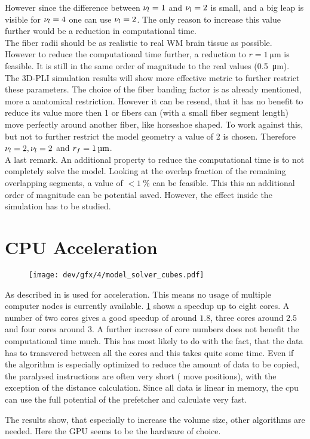 However since the difference between $\textnormal{$\nu_{l}$}=\SI{1}{}$ and $\textnormal{$\nu_{l}$}=\SI{2}{}$ is small, and a big leap is visible for $\textnormal{$\nu_{l}$}=\SI{4}{}$ one can use $\textnormal{$\nu_{l}$}=\SI{2}{}$.
The only reason to increase this value further would be a reduction in computational time.
\\
% 
The fiber radii should be as realistic to real \acs{WM} brain tissue as possible.
However to reduce the computational time further, a reduction to $r = \SI{1}{\micro\meter}$ is feasible.
It is still in the same order of magnitude to the real values (\SI{0.5}{\micro\meter}).
The \ac{3D-PLI} simulation results will show more effective metric to further restrict these parameters.
% 
The choice of the fiber banding factor is as already mentioned, more a anatomical restriction.
However it can be resend, that it has no benefit to reduce its value more then 1 or fibers can (with a small fiber segment length) move perfectly around another fiber, like horseshoe shaped.
To work against this, but not to further restrict the model geometry a value of 2 is chosen.
Therefore $\textnormal{$\nu_{l}$} = \SI{2}{}, \textnormal{$\nu_{l}$}=\SI{2}{}$ and $\fiberRadius=\SI{1}{\micro\meter}$.
\\
% 
A last remark.
An additional property to reduce the computational time is to not completely solve the model. 
Looking at the overlap fraction of the remaining overlapping segments, a value of $<\SI{1}{\percent}$ can be feasible.
This this an additional order of magnitude can be potential saved.
However, the effect inside the simulation has to be studied.
% 
\section{CPU Acceleration}
% 
\begin{figure}[!t]
\centering
\texttt{[image: dev/gfx/4/model\_solver\_cubes.pdf]}
\caption[speedup]{ }
\label{fig:solverSpeedup}
\end{figure}
% 
% 
As described in \dummy{} \openmp{} is used for acceleration.
This means no usage of multiple computer nodes is currently available.
\cref{fig:solverSpeedup} shows a speedup up to eight cores.
A number of two cores gives a good speedup of around $1.8$, three cores around $2.5$ and four cores around $3$.
A further incresse of core numbers does not benefit the computational time much.
This has most likely to do with the fact, that the data has to transvered between all the cores and this takes quite some time.
Even if the algorithm is especially optimized to reduce the amount of data to be copied, the paralysed instructions are often very short (\eg{} move positions), with the exception of the distance calculation.
Since all data is linear in memory, the cpu can use the full potential of the prefetcher and calculate very fast.
\par
% 
The results show, that especially to increase the volume size, other algorithms are needed. 
Here the \ac{GPU} seems to be the hardware of choice.
% 
% 
% 
